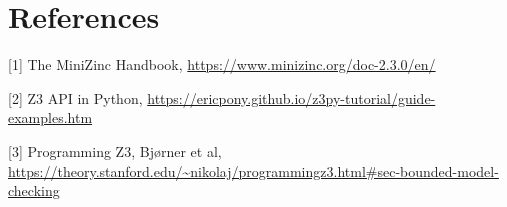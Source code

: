 \section{References}

[1] The MiniZinc Handbook, \url{https://www.minizinc.org/doc-2.3.0/en/}

[2] Z3 API in Python, \url{https://ericpony.github.io/z3py-tutorial/guide-examples.htm}

[3] Programming Z3, Bjørner et al, \\ \url{https://theory.stanford.edu/~nikolaj/programmingz3.html#sec-bounded-model-checking}